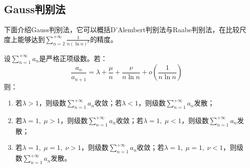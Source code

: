 \subsection{Gauss判别法}
下面介绍Gauss判别法，它可以概括D'Alembert判别法与Raabe判别法，在比较尺度上能够达到$\sum\limits_{n=2}^{+\infty}\frac{1}{n(\ln n)^p}$的精度。
\begin{theorem}
	设$\sum\limits_{n=1}^{+\infty}a_n$是严格正项级数。若：
	\begin{equation*}
		\frac{a_n}{a_{n+1}}=\lambda+\frac{\mu}{n}+\frac{\nu}{n\ln n}+o(\frac{1}{n\ln n})
	\end{equation*}
	则：
	\begin{enumerate}
		\item 若$\lambda>1$，则级数$\sum\limits_{n=1}^{+\infty}a_n$收敛；若$\lambda<1$，则级数$\sum\limits_{n=1}^{+\infty}a_n$发散；
		\item 若$\lambda=1,\;\mu>1$，则级数$\sum\limits_{n=1}^{+\infty}a_n$收敛；若$\lambda=1,\;\mu<1$，则级数$\sum\limits_{n=1}^{+\infty}a_n$发散；
		\item 若$\lambda=1,\;\mu=1,\;\nu>1$，则级数$\sum\limits_{n=1}^{+\infty}a_n$收敛；若$\lambda=1,\;\mu=1,\;\nu<1$，则级数$\sum\limits_{n=1}^{+\infty}a_n$发散。
	\end{enumerate}
\end{theorem}
